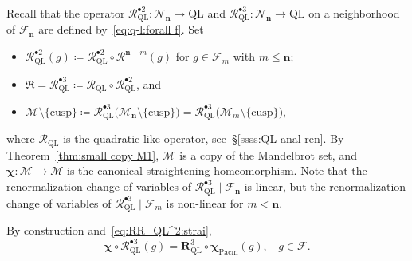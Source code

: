 \documentclass{amsart}
\renewcommand{\sp}{{\ \ }}
\newcommand{\1}{{\mathbb 1 }}
\newcommand\NN{\mathcal{N}}
\newcommand{\Mandel}{{\mathcal{M}}}
\newcommand\MM{\mathscr{M}}
\newcommand\RRR{{\mathfrak R}}
\newcommand\RR{\mathcal{R}}
\newcommand\mRR{\boldsymbol R}%
\newcommand{\bbn}{{\mathbf n}}
\newcommand\strai{{\boldsymbol \chi}}
\newcommand\cp{{}}%
\newcommand\Pacm{{\operatorname{Pacm}}}
\newcommand{\bFol}{{\boldsymbol{ \mathcal F}}}
\theoremstyle{remark}
\numberwithin{equation}{section}
\theoremstyle{definition}
\def\QL{{\text{QL}}}
\theoremstyle{nonumberbreak}
\begin{document}
Recall that the operator $\RR_{\QL}^{\bullet 2}\colon \NN_\bbn\to \QL$ and $\RR_{\QL}^{\bullet 3}\colon \NN_\bbn\to \QL$ on a neighborhood of $\bFol_\bbn$ are defined by~\eqref{eq:q-l:forall f}. Set 
\begin{itemize}
\item $  \RR_\QL^{\bullet 2} (g)\coloneqq  \RR_\QL^{\bullet 2} \circ \RR^{\bbn-m} (g)$ for $g\in \bFol_m$ with $m\le \bbn$; 
\item $\RRR=\RR_\QL^{\bullet 3}\coloneqq \RR_\QL\circ \RR_\QL^{\bullet 2}$, and
\item $\MM_\cp\setminus \{\text{cusp}\}\coloneqq \RR_\QL^{\bullet 3} \big(\MM_\bbn\setminus \{\text{cusp}\}\big)=\RR_\QL^{\bullet 3} \big(\MM_m\setminus \{\text{cusp}\}\big)$,
\end{itemize}
 where $\RR_\QL$ is the quadratic-like operator, see~\S\ref{ssss:QL anal ren}. By Theorem~\ref{thm:small copy M1}, $\MM_\cp$ is a copy of the Mandelbrot set, and $\strai\colon \MM_\cp\to \Mandel$ is the canonical straightening homeomorphism. Note that the renormalization change of variables of $\RR_\QL^{\bullet 3}\mid \bFol_\bbn$ is linear, but the renormalization change of variables of $\RR_\QL^{\bullet 3}\mid \bFol_m$ is non-linear for $m<\bbn$.  
 
 
 
  By construction and~\eqref{eq:RR_QL^2:strai}, 
\begin{equation}
 \strai \circ \RR_{\QL}^{\bullet 3}(g) = \mRR_\QL^3\circ  \strai_\Pacm(g),\sp\sp g\in \bFol.
\end{equation}
\end{document}
